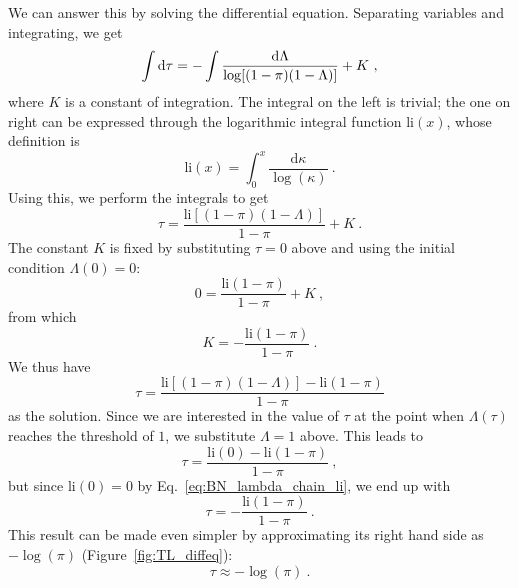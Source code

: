 \documentclass[11pt]{article}
\newcommand{\ud}{\text{d}}
\let\originalleft\left
\let\originalright\right
\renewcommand{\left}{\mathopen{}\mathclose\bgroup\originalleft}
\renewcommand{\right}{\aftergroup\egroup\originalright}
\begin{document}
We can answer this by solving the differential equation. Separating variables and integrating, we get
\begin{equation}
  \label{eq:BN_lambda_chain_12}
  \int \ud \tau =
  - \int \frac{\ud \Lambda}{\log \left[ (1 - \pi) (1 - \Lambda) \right]} + K \ ,
\end{equation}
where $K$ is a constant of integration. The integral on the left is trivial; the one on right can be expressed through the logarithmic integral function $\text{li}(x)$, whose definition is
\begin{equation}
  \label{eq:BN_lambda_chain_li}
  \text{li}(x) =  \int_0^x \frac{\ud \kappa}{\log(\kappa)} \ .
\end{equation}
Using this, we perform the integrals to get
\begin{equation}
  \label{eq:BN_lambda_chain_13}
  \tau = \frac{\text{li}[(1-\pi)(1-\Lambda)]}{1-\pi} + K \ .
\end{equation}
The constant $K$ is fixed by substituting $\tau=0$ above and using the initial condition $\Lambda(0)=0$:
\begin{equation}
  \label{eq:BN_lambda_chain_14}
  0 = \frac{\text{li}(1-\pi)}{1-\pi} + K \ ,
\end{equation}
from which
\begin{equation}
  \label{eq:BN_lambda_chain_15}
  K = - \frac{\text{li}(1-\pi)}{1-\pi} \ .
\end{equation}
We thus have
\begin{equation}
  \label{eq:BN_lambda_chain_16}
  \tau = \frac{\text{li}[(1-\pi)(1-\Lambda)] - \text{li}(1-\pi)}{1-\pi}
\end{equation}
as the solution. Since we are interested in the value of $\tau$ at the point when $\Lambda(\tau)$ reaches the threshold of $1$, we substitute $\Lambda=1$ above. This leads to
\begin{equation}
  \label{eq:BN_lambda_chain_17}
  \tau = \frac{\text{li}(0) - \text{li}(1-\pi)}{1-\pi} \ ,
\end{equation}
but since $\text{li}(0)=0$ by Eq.~\ref{eq:BN_lambda_chain_li}, we end up with
\begin{equation}
  \label{eq:BN_lambda_chain_18}
  \tau = - \frac{\text{li}(1-\pi)}{1-\pi} \ .
\end{equation}
This result can be made even simpler by approximating its right hand side as $-\log(\pi)$ (Figure~\ref{fig:TL_diffeq}):
\begin{equation}
  \label{eq:BN_lambda_chain_19}
  \tau \approx - \log(\pi) \ .
\end{equation}
\end{document}
